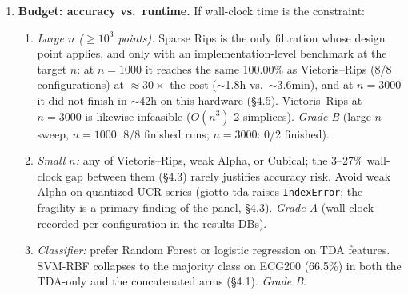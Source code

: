 \documentclass[12pt, a4paper]{report}
\theoremstyle{definition}
\theoremstyle{plain}
\theoremstyle{remark}
\begin{document}
\begin{enumerate}
\begin{enumerate}
      \item \emph{Point clouds:} on saturated topology tasks no stage
        matters: at $\sigma{=}0$ all 112 configurations score
        $\ge 99.5$\% (mean 99.99\%) and every stage range is below
        $0.1$pp (vectorizer $0.09$, filtration $0.02$, classifier $0.05$);
        at $\sigma{=}0.30$ the largest stage range is $0.66$pp
        (vectorizer). \emph{Grade A} for saturation. Where the classes
        differ in genus or component count, TDA separates them nearly
        perfectly and the matched-genus control shows the topological
        signal survives $\sigma{=}0.30$ (TDA $95.83$\% vs.\ norm features
        $48$--$58$\%; \S4.2). \emph{Grade A}.
    \end{enumerate}

  \item \textbf{Budget: accuracy vs.\ runtime.} If wall-clock time is the
    constraint:
    \begin{enumerate}
      \item \emph{Large $n$ ($\ge 10^3$ points):} Sparse Rips is the only
        filtration whose design point applies, and only with an
        implementation-level benchmark at the target $n$: at $n{=}1000$ it
        reaches the same 100.00\% as Vietoris--Rips (8/8 configurations)
        at $\approx 30\times$ the cost ($\sim$1.8h vs.\ $\sim$3.6min), and
        at $n{=}3000$ it did not finish in $\sim$42h on this hardware
        (\S4.5). Vietoris--Rips at $n{=}3000$ is likewise infeasible
        ($O(n^3)$ 2-simplices). \emph{Grade B} (large-$n$ sweep,
        $n{=}1000$: 8/8 finished runs; $n{=}3000$: 0/2 finished).
      \item \emph{Small $n$:} any of Vietoris--Rips, weak Alpha, or
        Cubical; the 3--27\% wall-clock gap between them (\S4.3)
        rarely justifies accuracy risk. Avoid weak Alpha on quantized UCR series
        (giotto-tda raises \texttt{IndexError}; the fragility is a
        primary finding of the panel, \S4.3). \emph{Grade A}
        (wall-clock recorded per configuration in the results DBs).
      \item \emph{Classifier:} prefer Random Forest or logistic regression
        on TDA features. SVM-RBF collapses to the majority class on ECG200
        (66.5\%) in both the TDA-only and the concatenated arms (\S4.1).
        \emph{Grade B}.
    \end{enumerate}


\end{enumerate}
\end{document}
